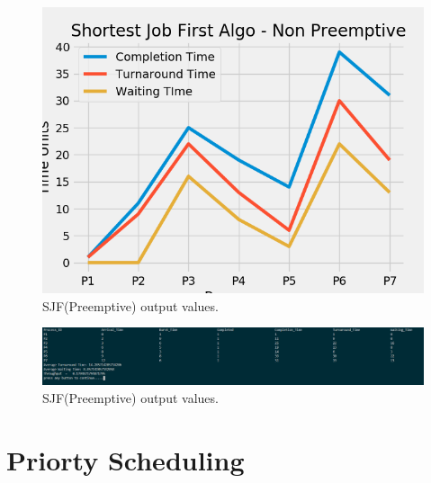 \documentclass[11pt,a4paper]{report}
\begin{document}
{\begin{figure}[H]
	\centering
	\includegraphics[scale=0.75]{./img/SJF_NP_output.png}
	\caption{SJF(Preemptive) output values.}
\end{figure}}

{\begin{figure}[H]
	\centering
	\includegraphics[scale=0.4]{./img/sjf_np_out.PNG}
	\caption{SJF(Preemptive) output values.}
\end{figure}}


\chapter{Priorty Scheduling}
\end{document}
